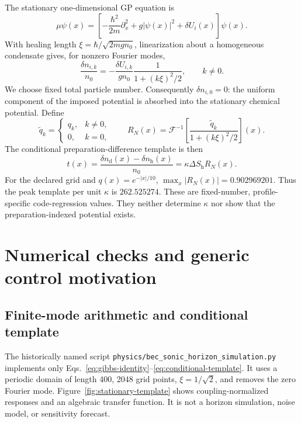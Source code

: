 \documentclass[aps,prd,twocolumn,superscriptaddress,nofootinbib,floatfix]{revtex4-2}
\begin{document}
The stationary one-dimensional GP equation is
\begin{equation}
 \mu\psi(x)=\left[-\frac{\hbar^2}{2m}\partial_x^2
 +g|\psi(x)|^2+\delta U_i(x)\right]\psi(x).
 \label{eq:stationary-gp}
\end{equation}
With healing length $\xi=\hbar/\sqrt{2mgn_0}$, linearization about a homogeneous condensate gives, for nonzero Fourier modes,
\begin{equation}
 \frac{\delta n_{i,k}}{n_0}
 =-\frac{\delta U_{i,k}}{gn_0}
 \frac{1}{1+(k\xi)^2/2},\qquad k\ne0.
 \label{eq:static-response}
\end{equation}
We choose fixed total particle number. Consequently $\delta n_{i,0}=0$: the uniform component of the imposed potential is absorbed into the stationary chemical potential. Define
\begin{equation}
 \widetilde q_k=
 \begin{cases}q_k,&k\ne0,\\0,&k=0,\end{cases}
 \qquad
 R_N(x)=\mathcal F^{-1}\!\left[
 \frac{\widetilde q_k}{1+(k\xi)^2/2}\right](x).
 \label{eq:fixed-number-profile}
\end{equation}
The conditional preparation-difference template is then
\begin{equation}
 t(x)=\frac{\delta n_{\mathrm d}(x)-\delta n_{\mathrm h}(x)}{n_0}
 =\kappa\Delta S_{\mathrm h}R_N(x).
 \label{eq:conditional-template}
\end{equation}
For the declared grid and $q(x)=e^{-|x|/10}$, $\max_x|R_N(x)|=0.902969201$. Thus the peak template per unit $\kappa$ is $262.525274$. These are fixed-number, profile-specific code-regression values. They neither determine $\kappa$ nor show that the preparation-indexed potential exists.

\section{Numerical checks and generic control motivation}
\label{sec:numerics}

\subsection{Finite-mode arithmetic and conditional template}

The historically named script \texttt{physics/bec\_sonic\_horizon\_simulation.py} implements only Eqs.~\eqref{eq:gibbs-identity}--\eqref{eq:conditional-template}. It uses a periodic domain of length 400, 2048 grid points, $\xi=1/\sqrt2$, and removes the zero Fourier mode. Figure~\ref{fig:stationary-template} shows coupling-normalized responses and an algebraic transfer function. It is not a horizon simulation, noise model, or sensitivity forecast.
\end{document}
